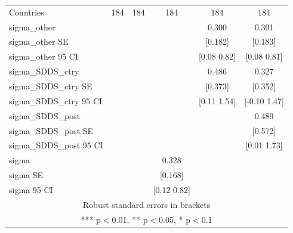 \begin{tabular}{lccccc}
Countries & 184 & 184 & 184 & 184 & 184 \\
sigma\_other &  &  &  & 0.300 & 0.301 \\
sigma\_other SE &  &  &  & [0.182] & [0.183] \\
sigma\_other 95 CI &  &  &  & [0.08 0.82] & [0.08 0.81] \\
sigma\_SDDS\_ctry &  &  &  & 0.486 & 0.327 \\
sigma\_SDDS\_ctry SE &  &  &  & [0.373] & [0.352] \\
sigma\_SDDS\_ctry 95 CI &  &  &  & [0.11 1.54] & [-0.10 1.47] \\
sigma\_SDDS\_post &  &  &  &  & 0.489 \\
sigma\_SDDS\_post SE &  &  &  &  & [0.572] \\
sigma\_SDDS\_post 95 CI &  &  &  &  & [0.01 1.73] \\
sigma &  &  & 0.328 &  &  \\
sigma SE &  &  & [0.168] &  &  \\
 sigma 95 CI &  &  & [0.12 0.82] &  &  \\ \hline
\multicolumn{6}{c}{ Robust standard errors in brackets} \\
\multicolumn{6}{c}{ *** p$<$0.01, ** p$<$0.05, * p$<$0.1} \\
\end{tabular}

